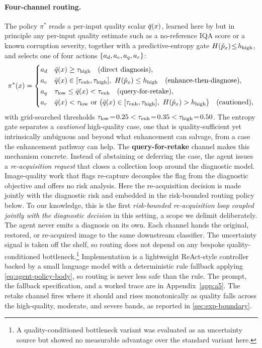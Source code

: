 \paragraph{Four-channel routing.}\label{sec:agent-routing}
The policy $\pi^{*}$ reads a per-input quality scalar $\bar{q}(x)$, learned here by \visiscore{} but in
principle any per-input quality estimate such as a no-reference IQA score or a known corruption
severity, together with a predictive-entropy gate $H(\hat p_x)\!\le\!h_{\mathrm{high}}$, and selects one of
four actions $\{a_d,a_e,a_q,a_r\}$:
\begin{equation}
\pi^{*}(x)=
\begin{cases}
\actd & \qbar(x)\geq\tauhigh \quad\text{(direct diagnosis)},\\[1pt]
\acte & \qbar(x)\in[\tauenh,\tauhigh],\ \Hent(\hat p_x)\leq\hhigh \quad\text{(enhance-then-diagnose)},\\[1pt]
\actq & \taulow\leq\qbar(x)<\tauenh \quad\text{(query-for-retake)},\\[1pt]
\actr & \qbar(x)<\taulow\ \text{or}\ \big(\qbar(x)\in[\tauenh,\tauhigh],\ \Hent(\hat p_x)>\hhigh\big) \quad\text{(cautioned)},
\end{cases}
\label{eq:agent-policy-body}
\end{equation}
with grid-searched thresholds $\tau_{\mathrm{low}}\!=\!0.25<\tau_{\mathrm{enh}}\!=\!0.35<\tau_{\mathrm{high}}\!=\!0.50$. The entropy gate
separates a \emph{cautioned} high-quality case, one that is quality-sufficient yet intrinsically
ambiguous and beyond what enhancement can salvage, from a case the enhancement pathway can help. The
\textbf{query-for-retake} channel makes this mechanism concrete. Instead of abstaining
\citep{geifman2017selective} or deferring the case, the agent issues a \emph{re-acquisition request}
that closes a collection loop around the diagnostic model. Image-quality work that flags re-capture
\citep{vodrahalli2021teledermatology,jalaboi2023explainable} decouples the flag from the diagnostic
objective and offers no risk analysis. Here the re-acquisition decision is made jointly with the
diagnostic risk and embedded in the risk-bounded routing policy below. To our knowledge, this is the
first \emph{risk-bounded re-acquisition loop coupled jointly with the diagnostic decision} in this
setting, a scope we delimit deliberately. The agent never emits a diagnosis on its own. Each channel
hands the original, restored, or re-acquired image to the same downstream classifier. The uncertainty
signal is taken off the shelf, so routing does not depend on any bespoke quality-conditioned
bottleneck.\footnote{A quality-conditioned bottleneck variant was evaluated as an uncertainty source
but showed no measurable advantage over the standard variant here.} Implementation is a lightweight
ReAct-style controller backed by a small language model with a deterministic rule fallback applying
\eqref{eq:agent-policy-body}, so routing is never less safe than the rule. The prompt, the fallback
specification, and a worked trace are in Appendix~\ref{app:a5}. The retake channel fires where it
should and rises monotonically as quality falls across the high-quality, moderate, and severe bands,
as reported in \cref{sec:exp-boundary}.

